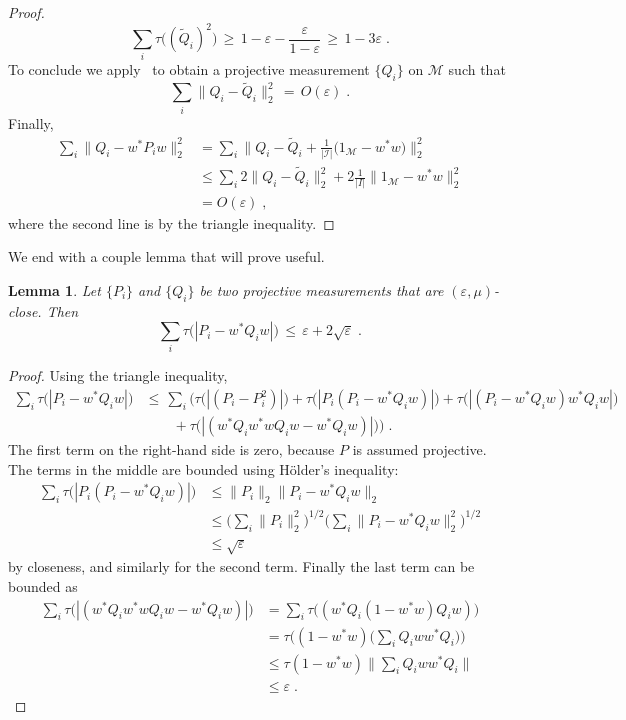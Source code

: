 \documentclass[11pt]{article}
\newtheorem{lemma}[theorem]{Lemma}
\theoremstyle{definition}
\newcommand{\mM}{\ensuremath{\mathcal{M}}}
\newcommand{\mI}{\ensuremath{\mathcal{I}}}
\newcommand{\eps}{\varepsilon}
\begin{document}
\begin{proof}
\[ \sum_{i} \tau\big( (\tilde{Q}_i)^2 \big) \,\geq\, 1-\eps-\frac{\eps}{1-\eps}\,\geq\, 1-3\eps\;.\]
To conclude we apply~\cite[Theorem 1.2]{de2021orthogonalization} to obtain a projective measurement $\{Q_i\}$ on $\mM$ such that 
\begin{equation*}
\sum_i \big\|{Q}_i - \tilde{Q}_i \big\|^2_2 \,=\, O(\eps)\;.
\end{equation*}
Finally,
\begin{align*}
\sum_i \big\|{Q}_i - w^*{P}_i w\big\|^2_2 &= \sum_i \Big\|{Q}_i - \tilde{Q}_i  + \frac{1}{|\mI|}\big(1_\mM - w^* w\big) \Big\|^2_2\\
&\leq  \sum_i 2\big\|{Q}_i - \tilde{Q}_i\big\|_2^2  + 2\frac{1}{|I|}\big\|1_\mM - w^* w\big\|_2^2 \\
&=  O(\eps)\;,
\end{align*}
where the second line is by the triangle inequality. 
\end{proof}

We end with a couple lemma that will prove useful. 

\begin{lemma}\label{lem:l1-l2}
Let $\{P_i\}$ and $\{Q_i\}$ be two projective measurements that are $(\eps,\mu)$-close. Then 
\begin{equation}\label{eq:l1-l2}
\sum_i \tau\big(|P_i-w^*Q_iw|\big) \,\leq\, \eps+ 2 \sqrt{\eps}\;.
\end{equation}
\end{lemma}

\begin{proof}
Using the triangle inequality, 
\begin{align*}
 \sum_i \tau\big(|P_i - w^* Q_i w|\big) &\leq\, \sum_i \Big(\tau\big(|(P_i-P_i^2)|\big) + \tau\big(|P_i(P_i-w^*Q_iw)|\big) + \tau\big(|(P_i-w^*Q_iw)w^*Q_iw|\big) \\
&\qquad +\tau\big(| (w^*Q_iw^*wQ_iw-w^*Q_iw)|\big)\Big)\;.
\end{align*}
The first term on the right-hand side is zero, because $P$ is assumed projective. The terms in the middle are bounded using H\"older's inequality:
\begin{align*}
\sum_i  \tau\big(|P_i(P_i-w^*Q_iw)|\big) &\leq  \|P_i\|_2 \|P_i-w^*Q_iw\|_2\\
&\leq \Big(\sum_i \|P_i\|^2_2\Big)^{1/2}\Big( \sum_i  \|P_i-w^*Q_iw\|_2^2 \Big)^{1/2}\\
&\leq \sqrt{\eps}
\end{align*}
by closeness, and similarly for the second term. 
Finally the last term can be bounded as 
\begin{align*}
\sum_i \tau\big(| (w^*Q_iw^*wQ_iw-w^*Q_iw)|\big) &= \sum_i \tau\big( (w^*Q_i(1-w^*w)Q_iw)\big)\\
&=  \tau\Big( (1-w^*w)\Big(\sum_i Q_iww^* Q_i\Big)\Big)\\
&\leq \tau(1-w^*w) \Big\|\sum_i Q_iww^* Q_i\Big\|\\
&\leq \eps\;.
\end{align*}
\end{proof}
\end{document}
